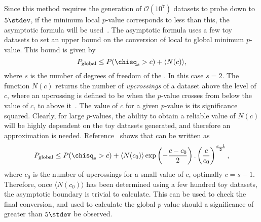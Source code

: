 Since this method requires the generation of $\mathcal{O}(10^7)$ datasets to probe down to
$5\stdev$, if the minimum local $p$-value corresponds to less than this, the asymptotic formula
will be used~\cite{Gross:2010qma}.
The asymptotic formula uses a few toy datasets to set an upper bound on the conversion of local to
global minimum $p$-value.
This bound is given by
\begin{equation}
  P_\mathrm{global} \leq P(\chisq_s > c) + \langle N(c)\rangle,
  \label{eq:db:asy1}
\end{equation}
where $s$ is the number of degrees of freedom of the \chisq.
In this case $s=2$.
The function $N(c)$ returns the number of \emph{upcrossings} of a dataset above the level of $c$,
where an upcrossing is defined to be when the $p$-value crosses from below the value of
$c$, to above it~\cite{Davies:1987zz}.
The value of $c$ for a given $p$-value is its significance squared.
Clearly, for large $p$-values, the ability to obtain a reliable value of $N(c)$ will be highly
dependent on the toy datasets generated, and therefore an approximation is needed.
Reference~\cite{Gross:2010qma} shows that  can be written as
\begin{equation}
  P_\mathrm{global} \leq P(\chisq_s > c)
  + \langle N(c_0)\rangle
  \exp\left(-\frac{c-c_0}{2}\right).
  \left(\frac{c}{c_0}\right)^{\frac{s-1}{2}},
  \label{eq:db:asy2}
\end{equation}
where $c_0$ is the number of upcrossings for a small value of $c$, optimally $c=s-1$.
Therefore, once $\langle N(c_0)\rangle$ has been determined using a few hundred toy datasets, the
asymptotic boundary is trivial to calculate.
This can be used to check the final conversion, and used to calculate the global $p$-value should a
significance of greater than $5\stdev$ be observed.


